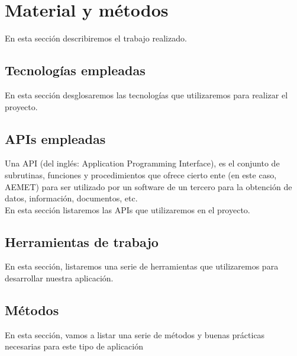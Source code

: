 \chapter{Material y métodos}
\label{material_y_metodos}

En esta sección describiremos el trabajo realizado.


\section{Tecnologías empleadas}
En esta sección desglosaremos las tecnologías que utilizaremos para realizar el proyecto.
















\section{APIs empleadas}
Una API (del inglés: Application Programming Interface), es el conjunto de subrutinas, funciones y procedimientos que ofrece cierto ente (en este caso, AEMET) para ser utilizado por un software de un tercero para la obtención de datos, información, documentos, etc.
\\
En esta sección listaremos las APIs que utilizaremos en el proyecto.





\section{Herramientas de trabajo}
En esta sección, listaremos una serie de herramientas que utilizaremos para desarrollar nuestra aplicación.

\section{Métodos}
En esta sección, vamos a listar una serie de métodos y buenas prácticas necesarias para este tipo de aplicación
